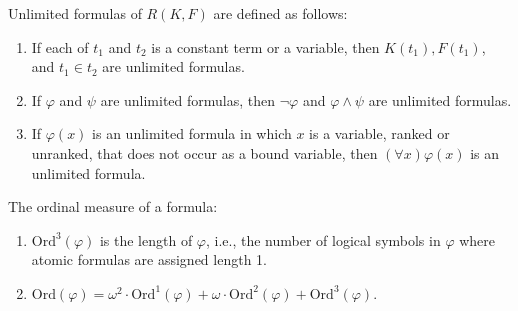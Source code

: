 Unlimited formulas of $R(K, F)$ are defined as follows:
\begin{enumerate}
\item If each of $t_1$ and $t_2$ is a constant term or a variable, then $K(t_1), F(t_1)$, and $t_1 \in t_2$ are unlimited formulas.
\item If $\varphi$ and $\psi$ are unlimited formulas, then $\neg \varphi$ and $\varphi \wedge \psi$ are unlimited formulas.
\item If $\varphi(x)$ is an unlimited formula in which $x$ is a variable, ranked or unranked, that does not occur as a bound variable, then $(\forall x)\varphi(x)$ is an unlimited formula.
\end{enumerate}
The ordinal measure of a formula:
\begin{enumerate}
\item $\text{Ord}^3(\varphi)$ is the length of $\varphi$, i.e., the number of logical symbols in $\varphi$ where atomic formulas are assigned length 1.
\item $\text{Ord}(\varphi) = \omega^2 \cdot \text{Ord}^1(\varphi) + \omega \cdot \text{Ord}^2(\varphi) + \text{Ord}^3(\varphi)$.
\end{enumerate}
